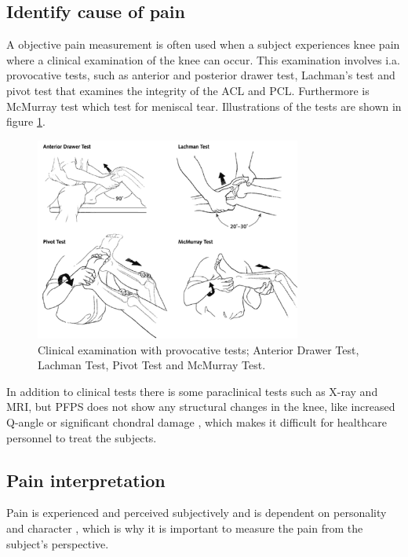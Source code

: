\subsection{Identify cause of pain}
A objective pain measurement is often used when a subject experiences knee pain where a clinical examination of the knee can occur. This examination involves i.a. provocative tests, such as anterior and posterior drawer test, Lachman’s test and pivot test that examines the integrity of the ACL and PCL. Furthermore is McMurray test which test for meniscal tear.\citep{Ghosh2010} Illustrations of the tests are shown in figure \ref{fig:kneetest}.

\begin{figure} [H]
\centering
\includegraphics[width=0.78\textwidth]{figures/kneetest}
\caption{Clinical examination with provocative tests; Anterior Drawer Test, Lachman Test, Pivot Test and McMurray Test.\citep{Ghosh2010}}
\label{fig:kneetest}
\end{figure}

\newpage
\noindent
In addition to clinical tests there is some paraclinical tests such as X-ray and MRI, but PFPS does not show any structural changes in the knee, like increased Q-angle or significant chondral damage \citep{Petersen2013}, which makes it difficult for healthcare personnel to treat the subjects. 

\subsection{Pain interpretation}
Pain is experienced and perceived subjectively \citep{IASP2012, Younger2009} and is dependent on personality and character \citep{Schmidt2013}, which is why it is important to measure the pain from the subject’s perspective.
 
